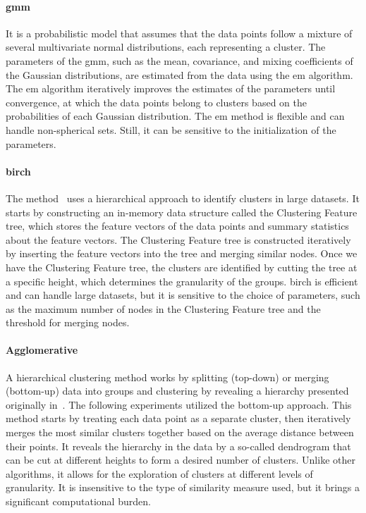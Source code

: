 \documentclass[a4paper, 10pt, twoside]{report}
\begin{document}
\paragraph{\acrfull{gmm}}
It is a probabilistic model that assumes that the data points follow a mixture of several multivariate normal distributions, each representing a cluster. The parameters of the \acrshort{gmm}, such as the mean, covariance, and mixing coefficients of the Gaussian distributions, are estimated from the data using the \acrfull{em} algorithm. The \acrshort{em} algorithm iteratively improves the estimates of the parameters until convergence, at which the data points belong to clusters based on the probabilities of each Gaussian distribution. The \acrshort{em} method is flexible and can handle non-spherical sets. Still, it can be sensitive to the initialization of the parameters.

\paragraph{\acrfull{birch}}
The method~\cite{birch} uses a hierarchical approach to identify clusters in large datasets. It starts by constructing an in-memory data structure called the Clustering Feature tree, which stores the feature vectors of the data points and summary statistics about the feature vectors. The Clustering Feature tree is constructed iteratively by inserting the feature vectors into the tree and merging similar nodes. Once we have the Clustering Feature tree, the clusters are identified by cutting the tree at a specific height, which determines the granularity of the groups. \acrshort{birch} is efficient and can handle large datasets, but it is sensitive to the choice of parameters, such as the maximum number of nodes in the Clustering Feature tree and the threshold for merging nodes.

\paragraph{Agglomerative}
A hierarchical clustering method works by splitting (top-down) or merging (bottom-up) data into groups and clustering by revealing a hierarchy presented originally in~\cite{sokal58}. The following experiments utilized the bottom-up approach. This method starts by treating each data point as a separate cluster, then iteratively merges the most similar clusters together based on the average distance between their points. It reveals the hierarchy in the data by a so-called dendrogram that can be cut at different heights to form a desired number of clusters.  Unlike other algorithms, it allows for the exploration of clusters at different levels of granularity. It is insensitive to the type of similarity measure used, but it brings a significant computational burden.
\end{document}
